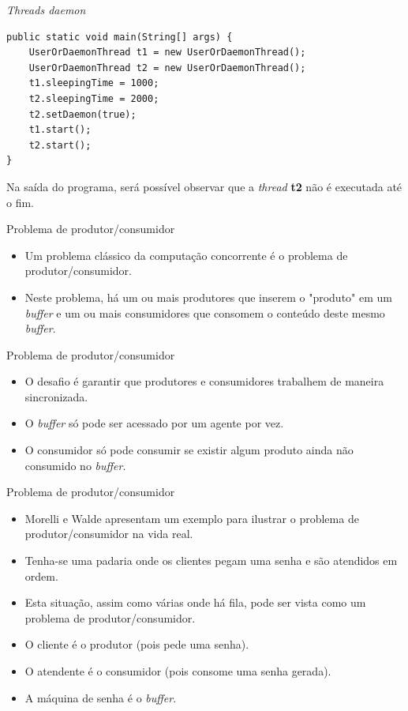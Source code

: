 \documentclass[11pt,justified]{beamer}
\begin{document}
\begin{frame}[fragile]{\textit{Threads daemon}}
    \begin{lstlisting}
public static void main(String[] args) {
    UserOrDaemonThread t1 = new UserOrDaemonThread();
    UserOrDaemonThread t2 = new UserOrDaemonThread();
    t1.sleepingTime = 1000;
    t2.sleepingTime = 2000;
    t2.setDaemon(true);
    t1.start();
    t2.start();
}
    \end{lstlisting}

    Na saída do programa, será possível observar que a \textit{thread} \textbf{t2} não é executada até o fim.
\end{frame}

\begin{frame}{Problema de produtor/consumidor}
    \begin{itemize}
        \item Um problema clássico da computação concorrente é o problema de produtor/consumidor.
        \item Neste problema, há um ou mais produtores que inserem o "produto" em um \textit{buffer} e um ou mais consumidores que consomem o conteúdo deste mesmo \textit{buffer}.
    \end{itemize}
\end{frame}

\begin{frame}{Problema de produtor/consumidor}
    \begin{itemize}
        \item O desafio é garantir que produtores e consumidores trabalhem de maneira sincronizada.
        \item O \textit{buffer} só pode ser acessado por um agente por vez.
        \item O consumidor só pode consumir se existir algum produto ainda não consumido no \textit{buffer}.
    \end{itemize}
\end{frame}

\begin{frame}{Problema de produtor/consumidor}
    \begin{itemize}
        \item Morelli e Walde apresentam um exemplo para ilustrar o problema de produtor/consumidor na vida real.
        \item Tenha-se uma padaria onde os clientes pegam uma senha e são atendidos em ordem.
        \item Esta situação, assim como várias onde há fila, pode ser vista como um problema de produtor/consumidor.
        \item O cliente é o produtor (pois pede uma senha).
        \item O atendente é o consumidor (pois consome uma senha gerada).
        \item A máquina de senha é o \textit{buffer}.
    \end{itemize}
\end{frame}
\end{document}
